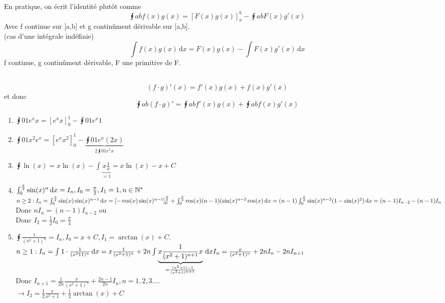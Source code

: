 \documentclass[12pt,a4paper]{article}
\begin{document}
{\begin{boite}
\\
En pratique, on écrit l'identité plutôt comme \\
\begin{equation}
	\intx{a}{b}{f(x)g(x)} = [F(x)g(x)]_a^b - \intx{a}{b}{F(x)g'(x)}
\end{equation}
Avec f continue sur [a,b] et g continûment dérivable sur [a,b].\\
 (cas d'une intégrale indéfinie)\\
\begin{equation}
	\int f(x)g(x) \, \mathrm dx = F(x)g(x) - \int F(x) g'(x) \, \mathrm dx
\end{equation}
f continue, g continûment dérivable, F une primitive de F.
\end{boite}
\\
\begin{equation}
(f\cdot g)'(x) = f'(x)g(x) + f(x)g'(x)
\end{equation}
et donc 
\begin{equation}
	\intx{a}{b}{(f\cdot g)'} = \intx{a}{b}{f'(x)g(x)} + \intx{a}{b}{f(x)g'(x)}
\end{equation}
\begin{enumerate}
	\item $\intx{0}{1}{e^xx} = [e^xx]_0^1-\intx{0}{1}{e^x1}$
	\item $\intx{0}{1}{x^2e^x} = [e^xx^2]_0^1 - \underbrace{\intx{0}{1}{e^x(2x)}}_{2\intx{0}{1}{e^xx}}$
	\item $\intx{}{}{\ln(x)} = x\ln(x) - \int{}{}{\underbrace{x\frac{1}{x}}_{=1}} = x\ln(x) - x + C$ 
	\item $\int_{0}^{\frac{\pi}{2}} \sin(x)^n \, \mathrm d x = I_n, I_0 = \frac{\pi}{2}, I_1 = 1, n \in \mathbb{N}^*$\\
	$n\geq 2 : I_n = \int_{0}^{\frac{\pi}{2}} \sin(x)\sin(x)^{n-1} \, \mathrm d x\\ 
	= [-\cos(x)\sin(x)^{n-1}]_0^{\frac{\pi}{2}} + \int_{0}^{\frac{\pi}{2}} \cos(x)(n-1)(\sin(x)^{n-2}\cos(x) \, \mathrm d x \\
	= (n-1)\int_{0}^{\frac{\pi}{2}} \sin(x)^{n-2}(1-\sin(x)^2) \, \mathrm d x \\
	= (n-1)I_{n-2} - (n-1)I_n$\\
	Donc $nI_n = (n-1)I_{n-2}$ ou \\
	Donc $I_2 = \frac{1}{2}I_0 = \frac{\pi}{4}$
	\item $\intx{}{}{\frac{1}{(x^2+1)^n}} = I_n, I_0 = x+C, I_1 = \arctan(x) + C$.\\
	$n\geq 1 : I_n = \int_{}^{} 1\cdot\frac{1}{(x^211)^n} \, \mathrm d x\\
	= x\frac{1}{(x^2+1)^n} + 2n \int_{}^{} \underbrace{x \frac{1}{(x^2+1)^{n+1}} x}_{= \frac{(x^2+1)-1}{(x^2+1)^{n+1}}} \, \mathrm d x\\
	I_n = \frac{x}{(x^2+1)^n} + 2n I_n - 2nI_{n+1}$\\
	Donc $I_{n+1} = \frac{1}{2n} \frac{x}{(x^2+1)^n}+\frac{2n-1}{2n} I_n, n = 1,2,3....$\\
	$\to I_2 = \frac{1}{2} \frac{x}{x^2+1} + \frac{1}{2}\arctan(x) + C$
	\end{enumerate}
}
\end{document}
